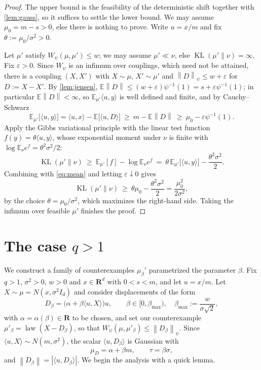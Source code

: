 \documentclass[10pt,a4paper]{amsart}
\def\R{\mathbf{R}}
\newcommand\opr[1]{\operatorname{#1}}
\newcommand{\ee}{\mathbb{E}}
\def\KL{\opr{KL}}
\newcommand{\norm}[1]{\left\lVert#1\right\rVert}
\numberwithin{equation}{section}
\begin{document}
\begin{proof}
The upper bound is the feasibility of the deterministic shift together with \cref{lem:gauss}, so it suffices to settle the lower bound. We may assume $\mu_0=m-s>0$, else there is nothing to prove. Write $u=x/m$ and fix $\theta:=\mu_0/\sigma^2>0$.

Let $\mu'$ satisfy $W_{\psi}(\mu,\mu')\le w$; we may assume $\mu'\ll\nu$, else $\KL(\mu'\|\nu)=\infty$. Fix $\varepsilon>0$. Since $W_\psi$ is an infimum over couplings, which need not be attained, there is a coupling $(X,X')$ with $X\sim\mu$, $X'\sim\mu'$ and $\norm{D}_{\psi}\le w+\varepsilon$ for $D:=X-X'$. By \cref{lem:jensen}, $\ee\norm{D}\le (w+\varepsilon)\psi^{-1}(1)=s+\varepsilon\psi^{-1}(1)$; in particular $\ee\norm{D}<\infty$, so $\ee_{\mu'}\langle u,y\rangle$ is well defined and finite, and by Cauchy--Schwarz
\begin{equation}\label{eq:mean}
\ee_{\mu'}\big[\langle u,y\rangle\big]=\langle u,x\rangle-\ee\big[\langle u,D\rangle\big]\ \ge\ m-\ee\norm{D}\ \ge\ \mu_0-\varepsilon\psi^{-1}(1).
\end{equation}
Apply the Gibbs variational principle with the linear test function $f(y)=\theta\langle u,y\rangle$, whose exponential moment under $\nu$ is finite with $\log\ee_\nu e^{f}=\theta^2\sigma^2/2$:
$$\KL(\mu'\|\nu)\ \ge\ \ee_{\mu'}[f]-\log\ee_{\nu}e^{f}\ =\ \theta\,\ee_{\mu'}\big[\langle u,y\rangle\big]-\frac{\theta^2\sigma^2}{2}.$$
Combining with \eqref{eq:mean} and letting $\varepsilon\downarrow 0$ gives
$$\KL(\mu'\|\nu)\ \ge\ \theta\mu_0-\frac{\theta^2\sigma^2}{2}=\frac{\mu_0^2}{2\sigma^2},$$
by the choice $\theta=\mu_0/\sigma^2$, which maximizes the right-hand side. Taking the infimum over feasible $\mu'$ finishes the proof.
\end{proof}

\section{The case \texorpdfstring{$q>1$}{q>1}}

We construct a family of counterexamples $\mu_{\beta}'$ parametrized the parameter $\beta$. Fix $q>1$, $\sigma^2>0$, $w>0$ and $x\in\R^d$ with $0<s<m$, and let $u=x/m$. Let $X\sim\mu=N(x,\sigma^2I_d)$ and consider displacements of the form
\begin{equation}\label{eq:family}
D_\beta=\big(\alpha+\beta\langle u,X\rangle\big)u,\qquad \beta\in[0,\beta_{\max}),\quad \beta_{\max}:=\frac{w}{\sigma\sqrt2},
\end{equation}
with $\alpha=\alpha(\beta)\in\R$ to be chosen, and set our counterexample $\mu'_\beta=\opr{law}(X-D_\beta)$, so that $W_\psi(\mu,\mu'_\beta)\le \norm{D_\beta}_\psi$. Since $\langle u,X\rangle\sim N(m,\sigma^2)$, the scalar $\langle u,D_\beta\rangle$ is Gaussian with
$$\mu_D=\alpha+\beta m,\qquad \tau=\beta\sigma,$$
and $\norm{D_\beta}=|\langle u,D_\beta\rangle|$. We begin the analysis with a quick lemma.
\end{document}
